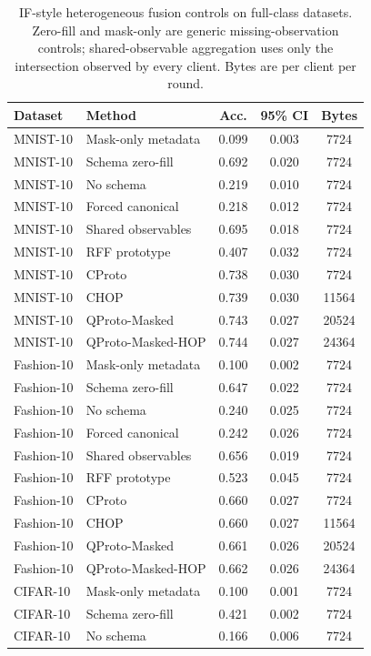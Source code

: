 \begin{table}[t]
\centering
\caption{IF-style heterogeneous fusion controls on full-class datasets. Zero-fill and mask-only are generic missing-observation controls; shared-observable aggregation uses only the intersection observed by every client. Bytes are per client per round.}
\label{tab:if-fusion-controls}
\begin{tabular}{llccc}
\toprule
Dataset & Method & Acc. & 95\% CI & Bytes \\
\midrule
MNIST-10 & Mask-only metadata & 0.099 & 0.003 & 7724 \\
MNIST-10 & Schema zero-fill & 0.692 & 0.020 & 7724 \\
MNIST-10 & No schema & 0.219 & 0.010 & 7724 \\
MNIST-10 & Forced canonical & 0.218 & 0.012 & 7724 \\
MNIST-10 & Shared observables & 0.695 & 0.018 & 7724 \\
MNIST-10 & RFF prototype & 0.407 & 0.032 & 7724 \\
MNIST-10 & CProto & 0.738 & 0.030 & 7724 \\
MNIST-10 & CHOP & 0.739 & 0.030 & 11564 \\
MNIST-10 & QProto-Masked & 0.743 & 0.027 & 20524 \\
MNIST-10 & QProto-Masked-HOP & 0.744 & 0.027 & 24364 \\
\midrule
Fashion-10 & Mask-only metadata & 0.100 & 0.002 & 7724 \\
Fashion-10 & Schema zero-fill & 0.647 & 0.022 & 7724 \\
Fashion-10 & No schema & 0.240 & 0.025 & 7724 \\
Fashion-10 & Forced canonical & 0.242 & 0.026 & 7724 \\
Fashion-10 & Shared observables & 0.656 & 0.019 & 7724 \\
Fashion-10 & RFF prototype & 0.523 & 0.045 & 7724 \\
Fashion-10 & CProto & 0.660 & 0.027 & 7724 \\
Fashion-10 & CHOP & 0.660 & 0.027 & 11564 \\
Fashion-10 & QProto-Masked & 0.661 & 0.026 & 20524 \\
Fashion-10 & QProto-Masked-HOP & 0.662 & 0.026 & 24364 \\
\midrule
CIFAR-10 & Mask-only metadata & 0.100 & 0.001 & 7724 \\
CIFAR-10 & Schema zero-fill & 0.421 & 0.002 & 7724 \\
CIFAR-10 & No schema & 0.166 & 0.006 & 7724 \\

\end{tabular}
\end{table}
